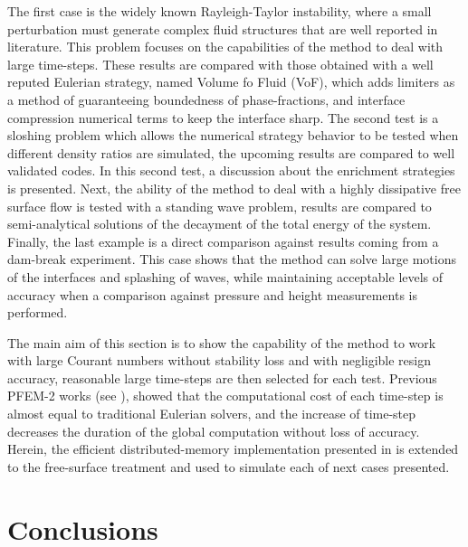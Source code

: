 \documentclass[review]{elsarticle}
\begin{document}
The first case is the widely known Rayleigh-Taylor instability, where a small perturbation must generate complex fluid structures that are well reported in literature.
This problem focuses on the capabilities of the method to deal with large time-steps. These results are compared with those obtained with a well reputed Eulerian strategy, named Volume fo Fluid (VoF), which adds limiters as a method of guaranteeing boundedness of phase-fractions, and interface compression numerical terms to keep the interface sharp.
The second test is a sloshing problem which allows the numerical strategy behavior to be tested when different density ratios are simulated, the upcoming results are compared to well validated codes. In this second test, a discussion about the enrichment strategies is presented. Next, the ability of the method to deal with a highly dissipative free surface flow is tested with a standing wave problem, results are compared to semi-analytical solutions of the decayment of the total energy of the system.
Finally, the last example is a direct comparison against results coming from a dam-break experiment.
This case shows that the method can solve large motions of the interfaces and splashing of waves, while maintaining acceptable levels of accuracy when a comparison against pressure and height measurements is performed.

The main aim of this section is to show the capability of the method to work with large Courant numbers without stability loss and with negligible resign accuracy, reasonable large time-steps are then selected for each test. Previous PFEM-2 works (see \cite{Idelsohn12b}\cite{Gimenez14}), showed that the computational cost of each time-step is almost equal to traditional Eulerian solvers, and the increase of time-step decreases the duration of the global computation without loss of accuracy. Herein, the efficient distributed-memory implementation presented in \cite{Gimenez14} is extended to the free-surface treatment and used to simulate each of next cases presented.






% 


\section{Conclusions}
\end{document}
